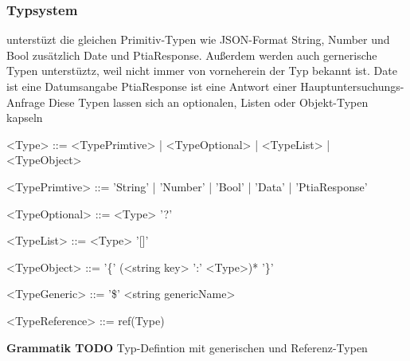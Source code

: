 \documentclass{article}
\begin{document}
    \subsubsection{Typsystem}
    unterstüzt die gleichen Primitiv-Typen wie JSON-Format String, Number und Bool zusätzlich Date und PtiaResponse. Außerdem werden auch gernerische Typen unterstüztz, weil nicht immer von vorneherein der Typ bekannt ist.
    Date ist eine Datumsangabe
    PtiaResponse ist eine Antwort einer Hauptuntersuchungs-Anfrage
    Diese Typen lassen sich an optionalen, Listen oder Objekt-Typen kapseln\\
    \begin{grammar}
        <Type> ::= <TypePrimtive> | <TypeOptional> | <TypeList> | <TypeObject>

        <TypePrimtive> ::= 'String' | 'Number' | 'Bool' | 'Data' | 'PtiaResponse'
        
        <TypeOptional> ::= <Type> '?'
        
        <TypeList> ::= <Type> '[]'
        
        <TypeObject> ::= '\{' (<string key> ':' <Type>)* '\}'

        <TypeGeneric> ::= '\$' <string genericName>

        <TypeReference> ::= ref(Type)
    \end{grammar}
    \textbf{Grammatik TODO} Typ-Defintion mit generischen und Referenz-Typen
\end{document}

